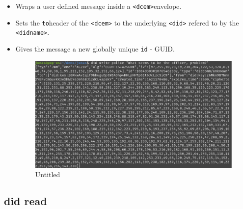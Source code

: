 \begin{itemize}
\item
  Wraps a user defined message inside a
  \passthrough{\lstinline!<dcem>!}envelope.
\item
  Sets the \passthrough{\lstinline!to!}header of the
  \passthrough{\lstinline!<dcem>!} to the underlying
  \passthrough{\lstinline!<did>!} refered to by the
  \passthrough{\lstinline!<didname>!}.
\item
  Gives the message a new globally unique \passthrough{\lstinline!id!} -
  GUID.

  \begin{figure}
  \centering
  \includegraphics{User Interface f8759a9462b24d5f95cf6123d68b89ea/Untitled 6.png}
  \caption{Untitled}
  \end{figure}
\end{itemize}

\hypertarget{did-read}{%
\subsection{\texorpdfstring{did read }{did read }}\label{did-read}}

